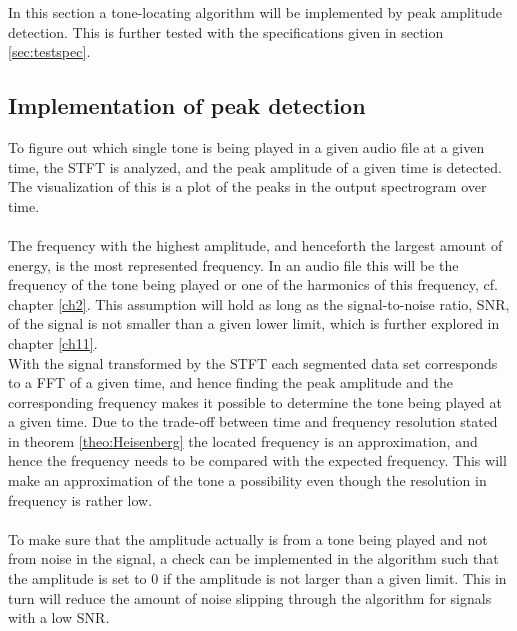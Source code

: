 \label{sec:peak_detection}
In this section a tone-locating algorithm will be implemented by peak amplitude detection.
This is further tested with the specifications given in section \ref{sec:testspec}.
\subsection{Implementation of peak detection}
To figure out which single tone is being played in a given audio file at a given time, the STFT is analyzed, and the peak amplitude of a given time is detected.
The visualization of this is a plot of the peaks in the output spectrogram over time.
\\ \\
The frequency with the highest amplitude, and henceforth the largest amount of energy, is the most represented frequency. 
In an audio file this will be the frequency of the tone being played or one of the harmonics of this frequency, cf. chapter \ref{ch2}.
This assumption will hold as long as the signal-to-noise ratio, SNR, of the signal is not smaller than a given lower limit, which is further explored in chapter \ref{ch11}. \\
With the signal transformed by the STFT each segmented data set corresponds to a FFT of a given time, and hence finding the peak amplitude and the corresponding frequency makes it possible to determine the tone being played at a given time. Due to the trade-off between time and frequency resolution stated in theorem \ref{theo:Heisenberg} the located frequency is an approximation, and hence the frequency needs to be compared with the expected frequency. 
This will make an approximation of the tone a possibility even though the resolution in frequency is rather low.
\\ \\
To make sure that the amplitude actually is from a tone being played and not from noise in the signal, a check can be implemented in the algorithm such that the amplitude is set to $0$ if the amplitude is not larger than a given limit.
This in turn will reduce the amount of noise slipping through the algorithm for signals with a low SNR.

